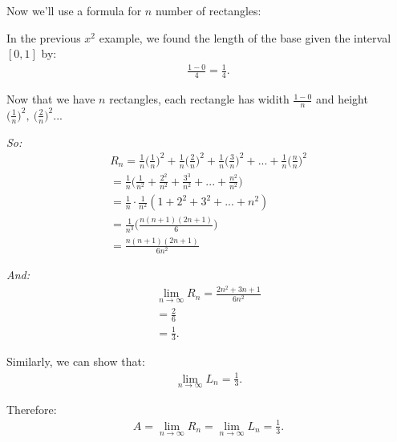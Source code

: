 \documentclass{report}
\begin{document}
\bigbreak \noindent \bigbreak \noindent
Now we'll use a formula for $n$ number of rectangles:

\bigbreak \noindent 
\begin{figure}[ht]
    \centering
    \label{fig:curve5}
\end{figure}

\bigbreak \noindent 
In the previous $x^{2}$ example, we found the length of the base given the interval $[0,1]$ by:
\begin{align*}
  \frac{1-0}{4} = \frac{1}{4}
.\end{align*}

\bigbreak \noindent 
Now that we have $n$ rectangles, each rectangle has widith $\frac{1-0}{n}$ and height $\bigg(\frac{1}{n}\bigg)^{2},\ \bigg(\frac{2}{n}\bigg)^{2}$...

\bigbreak \noindent
\textit{So:}
\begin{align*}
  R_{n} = \frac{1}{n}\bigg(\frac{1}{n}\bigg)^{2} + \frac{1}{n} \bigg(\frac{2}{n}\bigg)^{2} + \frac{1}{n}\bigg(\frac{3}{n}\bigg)^{2} + ... + \frac{1}{n}\bigg(\frac{n}{n}\bigg)^{2} \\
  = \frac{1}{n}\bigg(\frac{1}{n^{2}} + \frac{2^{2}}{n^{2}}+\frac{3^{3}}{n^{2}} + ... + \frac{n^{2}}{n^{2}}\bigg) \\
  = \frac{1}{n} \cdot \frac{1}{n^{2}}(1+2^{2}+3^{2}+ ... + n^{2}) \\
  = \frac{1}{n^{3}} \bigg(\frac{n(n+1)(2n+1)}{6}\bigg) \\
  = \frac{n(n+1)(2n+1)}{6n^{2}}
\end{align*}

\bigbreak \noindent 
\textit{And:}
\begin{align*}
  \lim_{n \to \infty}{R_{n}=  \frac{2n^{2}+3n+1}{6n^{2}}} \\
  = \frac{2}{6} \\
  = \frac{1}{3}
.\end{align*}

\bigbreak \noindent 
Similarly, we can show that:
\begin{align*}
  \lim_{n \to \infty}{L_{n} = \frac{1}{3}}
.\end{align*}

\bigbreak \noindent 
Therefore: 
\begin{align*}
  A= \lim_{n \to \infty}{R_{n}} = \lim_{n \to \infty}{L_{n}} = \frac{1}{3}
.\end{align*}
\end{document}
